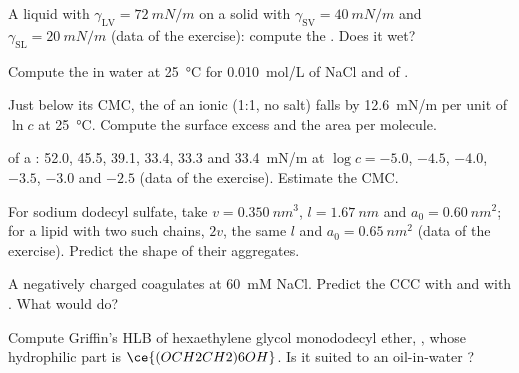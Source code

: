 \begin{exercise}[$\star$]\label{exo:b3:colloids:3}
A liquid with $\gamma_{\mathrm{LV}} = \qty{72}{mN/m}$ on a solid with $\gamma_{\mathrm{SV}} = \qty{40}{mN/m}$ and $\gamma_{\mathrm{SL}} =
\qty{20}{mN/m}$ (data of the exercise): compute the . Does it wet?
\end{exercise}

\begin{exercise}[$\star$]\label{exo:b3:colloids:4}
Compute the  in water at \qty{25}{\celsius} for \qty{0.010}{mol/L} of NaCl and of
.
\end{exercise}

\begin{exercise}[$\star\star$]\label{exo:b3:colloids:5}
Just below its CMC, the  of an ionic  (1:1, no salt)
falls by \qty{12.6}{mN/m} per unit of $\ln c$ at \qty{25}{\celsius}. Compute the surface excess and
the area per molecule.
\end{exercise}

\begin{exercise}[$\star\star$]\label{exo:b3:colloids:6}
 of a : 52.0, 45.5, 39.1, 33.4, 33.3 and
\qty{33.4}{mN/m} at $\log c = -5.0$, $-4.5$, $-4.0$, $-3.5$, $-3.0$ and $-2.5$ (data of the exercise).
Estimate the CMC.
\end{exercise}

\begin{exercise}[$\star\star$]\label{exo:b3:colloids:7}
For sodium dodecyl sulfate, take $v = \qty{0.350}{nm^3}$, $l = \qty{1.67}{nm}$ and $a_0 = \qty{0.60}{nm^2}$; for a
lipid with two such chains, $2v$, the same $l$ and $a_0 = \qty{0.65}{nm^2}$ (data of the
exercise). Predict the shape of their aggregates.
\end{exercise}

\begin{exercise}[$\star\star$]\label{exo:b3:colloids:8}
A negatively charged  coagulates at \qty{60}{mM} NaCl. Predict the CCC with 
and with . What would  do?
\end{exercise}

\begin{exercise}[$\star\star$]\label{exo:b3:colloids:9}
Compute Griffin's HLB of hexaethylene glycol monododecyl ether,
, whose hydrophilic part is $\ce{(OCH2CH2)6OH}$. Is it suited to an
oil-in-water ?
\end{exercise}

